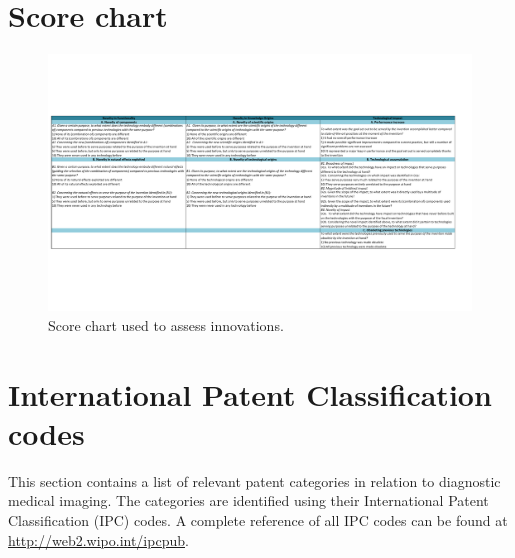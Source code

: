 \appendix
\chapter{Score chart}\label{app:score}
\begin{landscape}
	\begin{figure}[htp]
	\begin{center}
	  \includegraphics[width=\linewidth, trim=5 150 60 150]{img/score.pdf}
	  \caption{Score chart used to assess innovations.}
	  \label{fig:score}
	\end{center}
	\end{figure}
\end{landscape}

\chapter{International Patent Classification codes}
This section contains a list of relevant patent categories in relation to
diagnostic medical imaging. The categories are identified using their
International Patent Classification (IPC) codes. A complete reference of all IPC
codes can be found at \url{http://web2.wipo.int/ipcpub}.

